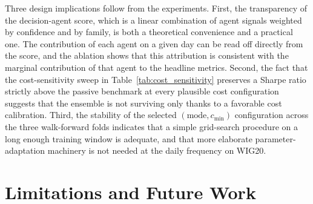 \documentclass{ieeeaccess}
\begin{document}
Three design implications follow from the experiments. First, the transparency of the decision-agent score, which is a linear combination of agent signals weighted by confidence and by family, is both a theoretical convenience and a practical one. The contribution of each agent on a given day can be read off directly from the score, and the ablation shows that this attribution is consistent with the marginal contribution of that agent to the headline metrics. Second, the fact that the cost-sensitivity sweep in Table~\ref{tab:cost_sensitivity} preserves a Sharpe ratio strictly above the passive benchmark at every plausible cost configuration suggests that the ensemble is not surviving only thanks to a favorable cost calibration. Third, the stability of the selected $(\text{mode}, c_{\min})$ configuration across the three walk-forward folds indicates that a simple grid-search procedure on a long enough training window is adequate, and that more elaborate parameter-adaptation machinery is not needed at the daily frequency on WIG20.

\section{Limitations and Future Work}
\label{sec:limitations}
\end{document}
